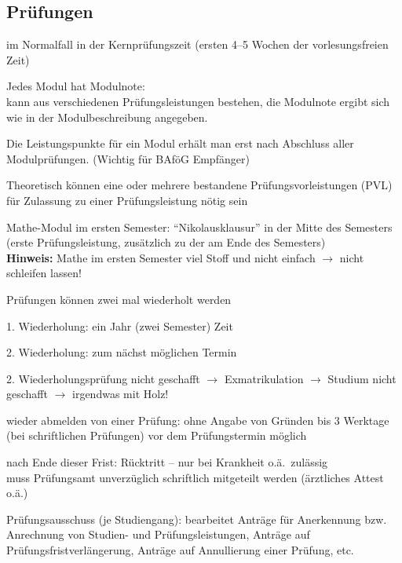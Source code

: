 \documentclass[a4paper,12pt]{report}
\begin{document}
\subsection{Prüfungen}
\begin{itemize*}
    \item im Normalfall in der Kernprüfungszeit (ersten 4--5 Wochen der vorlesungsfreien Zeit)
    \item Jedes Modul hat Modulnote:\\
        kann aus verschiedenen Prüfungsleistungen bestehen, die Modulnote ergibt sich wie in der Modulbeschreibung angegeben.
    \item Die Leistungspunkte für ein Modul erhält man erst nach Abschluss aller Modulprüfungen. (Wichtig für BAföG Empfänger)
    \item Theoretisch können eine oder mehrere bestandene Prüfungsvorleistungen (PVL) für Zulassung zu einer Prüfungsleistung nötig sein\\
    \item Mathe-Modul im ersten Semester: \enquote{Nikolausklausur} in der Mitte des Semesters (erste Prüfungsleistung, zusätzlich zu der am Ende des Semesters)\\
    \textbf{Hinweis:} Mathe im ersten Semester viel Stoff und nicht einfach $\rightarrow$ nicht schleifen lassen!
    \item Prüfungen können zwei mal wiederholt werden
    \begin{itemize*}
        \item 1. Wiederholung: ein Jahr (zwei Semester) Zeit
        \item 2. Wiederholung: zum nächst möglichen Termin
    \end{itemize*}
    2. Wiederholungsprüfung nicht geschafft $\rightarrow$ Exmatrikulation $\rightarrow$ Studium nicht geschafft $\rightarrow$ irgendwas mit Holz!
    \item wieder abmelden von einer Prüfung: ohne Angabe von Gründen bis 3 Werktage (bei schriftlichen Prüfungen) vor dem Prüfungstermin möglich
    \item nach Ende dieser Frist: Rücktritt -- nur bei Krankheit o.ä.\ zulässig\\
        muss Prüfungsamt unverzüglich schriftlich mitgeteilt werden (ärztliches Attest o.ä.)
    \item Prüfungsausschuss (je Studiengang): bearbeitet Anträge für Anerkennung bzw. Anrechnung von Studien- und Prüfungsleistungen, Anträge auf Prüfungsfristverlängerung, Anträge auf Annullierung einer Prüfung, etc.

\end{itemize*}
\end{document}
